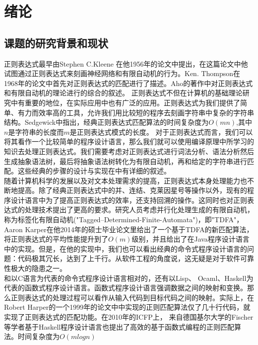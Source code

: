 \documentclass[openany,oneside]{book}
\theoremstyle{definition}
\theoremstyle{definition}
\begin{document}
\frontmatter
\sloppy %




\tableofcontents
{\xiaosi}
\clearpage{\pagestyle{empty}\cleardoublepage}

\mainmatter
{}                        %

\chapter{绪论}

	
	
\section{课题的研究背景和现状}
	正则表达式最早由Stephen C.Kleene 在他1956年的论文中提出\cite{Kleen72}，在这篇论文中他试图通过正则表达式来刻画神经网络和有限自动机的行为。Ken. Thompson在1968年的论文\cite{thompson1968programming}中首先对正则表达式的匹配进行了描述。Aho的著作\cite{Aho72a}中对正则表达式和有限自动机的理论进行的综合的叙述。
	正则表达式不但在计算机的基础理论研究中有重要的地位，在实际应用中也有广泛的应用。正则表达式为我们提供了简单、有力而效率高的工具，允许我们用比较短的程序去刻画字符串中复杂的字符串结构。Sedgewick\cite{Sedg92a}中指出，经典正则表达式匹配算法的时间复杂度为\(O\left( mn\right) \),其中\(n\)是字符串的长度而\(m\)是正则表达式模式的长度。
	对于正则表达式而言，我们可以将其看作一个比较简单的程序设计语言，那么我们就可以使用编译原理中所学习的知识去处理正则表达式。我们需要考虑对正则表达式进行词法分析、语法分析然后生成抽象语法树，最后将抽象语法树转化为有限自动机，再和给定的字符串进行匹配。这些经典的步骤的设计与实现在\cite{appel2004modern}中有详细的叙述。\\
	\indent 随着计算机科学的发展以及对文本处理需求的提高，正则表达式本身处理能力也不断地提高。除了经典正则表达式中的并、连结、克莱因星号等操作以外，现有的程序设计语言中为了提高正则表达式的效率，还支持回溯的操作。这同时也对正则表达式的处理技术提出了更高的要求。研究人员考虑并行化处理生成的有限自动机，称为标签化有限自动机("Tagged--Determined-Finite-Automata")，即"TDFA"，Aaron Karper\cite{karper2014efficient}在他2014年的硕士毕业论文里给出了一个基于TDFA的新匹配算法，将正则表达式的平均性能提升到了\(O\left( m\right) \)级别，并且给出了在Java程序设计语言中的实现。但是，在他的实现中，我们也可以看出经典的命令式程序设计语言的问题：代码极其冗长，达到了上千行。从软件工程的角度说，这无疑是对于软件可靠性极大的隐患之一。\\
	\indent 和以C语言为代表的命令式程序设计语言相对的，还有以Lisp、 Ocaml、Haskell为代表的函数式程序设计语言。函数式程序设计语言强调数据之间的映射和变换。那么正则表达式的处理过程可以看作从输入代码到目标代码之间的映射。实际上，在Robert Harper的一个1999年的论文中\cite{harper1999proof}中实现的正则匹配算法仅了几十行代码，就实现了正则表达式的匹配功能。在2010年的ICFP上， 来自德国基尔大学的Fischer等学者基于Haskell程序设计语言也提出了高效的基于函数式编程的正则匹配算法\cite{fischer2010play}。时间复杂度为\(O\left( mlogn\right) \)
\end{document}
